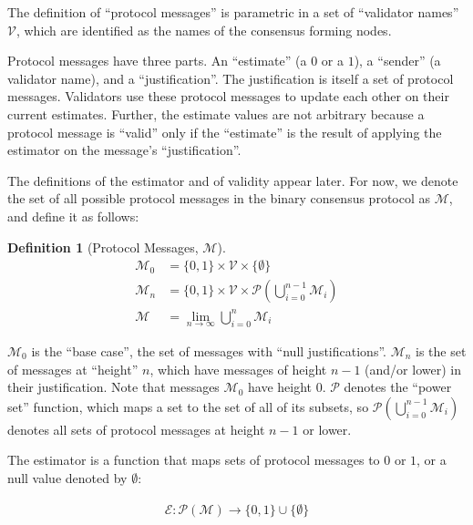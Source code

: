 \documentclass{article}
\theoremstyle{definition}
\newtheorem{defn}{Definition}[section]
\begin{document}
The definition of ``protocol messages'' is parametric in a set of ``validator names'' $\mathcal{V}$, which are identified as the names of the consensus forming nodes.

Protocol messages have three parts. An ``estimate'' (a $0$ or a $1$), a ``sender'' (a validator name), and a ``justification''. The justification is itself a set of protocol messages. Validators use these protocol messages to update each other on their current estimates. Further, the estimate values are not arbitrary because a protocol message is ``valid'' only if the ``estimate'' is the result of applying the estimator on the message's ``justification''.

The definitions of the estimator and of validity appear later. For now, we denote the set of all possible protocol messages in the binary consensus protocol as $\mathcal{M}$, and define it as follows:

\begin{defn}[Protocol Messages, $\mathcal{M}$]
\begin{equation*}
\begin{split}
    \mathcal{M}_0 &= \{0, 1\} \times \mathcal{V} \times \{\emptyset\}\\
    \mathcal{M}_n &= \{0, 1\} \times \mathcal{V} \times \mathcal{P}(\bigcup_{i=0}^{n-1} \mathcal{M}_i)\\
    \mathcal{M} &= \lim_{n \to \infty} \bigcup_{i=0}^{n} \mathcal{M}_i
\end{split}
\end{equation*}
\end{defn}

$\mathcal{M}_0$ is the ``base case'', the set of messages with ``null justifications''. $\mathcal{M}_n$ is the set of messages at ``height'' $n$, which have messages of height $n-1$ (and/or lower) in their justification. Note that messages $\mathcal{M}_0$ have height $0$. $\mathcal{P}$ denotes the ``power set'' function, which maps a set to the set of all of its subsets, so $\mathcal{P}(\bigcup_{i=0}^{n-1} \mathcal{M}_i)$ denotes all sets of protocol messages at height $n-1$ or lower.

The estimator is a function that maps sets of protocol messages to $0$ or $1$, or a null value denoted by $\emptyset$:

\begin{equation*}
\begin{split}
    \mathcal{E}:\mathcal{P}(\mathcal{M}) \to \{0, 1\} \cup \{\emptyset\}
\end{split}
\end{equation*}
\end{document}
